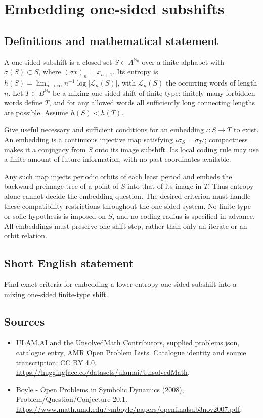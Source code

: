 \documentclass[11pt,a4paper]{article}
\begin{document}
\section*{Embedding one-sided subshifts}\label{statement}

\subsection{Definitions and mathematical statement}
A one-sided subshift is a closed set $S\subset A^{\mathbb N_0}$ over
a finite alphabet with $\sigma(S)\subset S$, where $(\sigma x)_n=x_{n+1}$.
Its entropy is $h(S)=\lim_{n\to\infty}n^{-1}\log|\mathcal L_n(S)|$,
with $\mathcal L_n(S)$ the occurring words of length $n$.
Let $T\subset B^{\mathbb N_0}$ be a mixing one-sided shift of finite
type: finitely many forbidden words define $T$, and for any allowed
words all sufficiently long connecting lengths are possible.
Assume $h(S)<h(T)$.

Give useful necessary and sufficient conditions for an embedding
$\iota:S\to T$ to exist. An embedding is a continuous injective map
satisfying $\iota\sigma_S=\sigma_T\iota$; compactness makes it a
conjugacy from $S$ onto its image subshift. Its local coding rule
may use a finite amount of future information, with no past
coordinates available.

Any such map injects periodic orbits of each least period and embeds
the backward preimage tree of a point of $S$ into that of its image
in $T$. Thus entropy alone cannot decide the embedding question.
The desired criterion must handle these compatibility restrictions
throughout the one-sided system. No finite-type or sofic hypothesis
is imposed on $S$, and no coding radius is specified in advance.
All embeddings must preserve one shift step, rather than only an
iterate or an orbit relation.
\subsection{Short English statement}
Find exact criteria for embedding a lower-entropy one-sided subshift into a mixing one-sided finite-type shift.
\subsection{Sources}
\begin{itemize}
\item[S1] ULAM.AI and the UnsolvedMath Contributors, supplied problems.json, catalogue entry, AMR Open Problem Lists. Catalogue identity and source transcription; CC BY 4.0.
\url{https://huggingface.co/datasets/ulamai/UnsolvedMath}.
\item[S2] Boyle - Open Problems in Symbolic Dynamics (2008), Problem/Question/Conjecture 20.1. 
\url{https://www.math.umd.edu/~mboyle/papers/openfinalsub3nov2007.pdf}.
\end{itemize}
\end{document}
